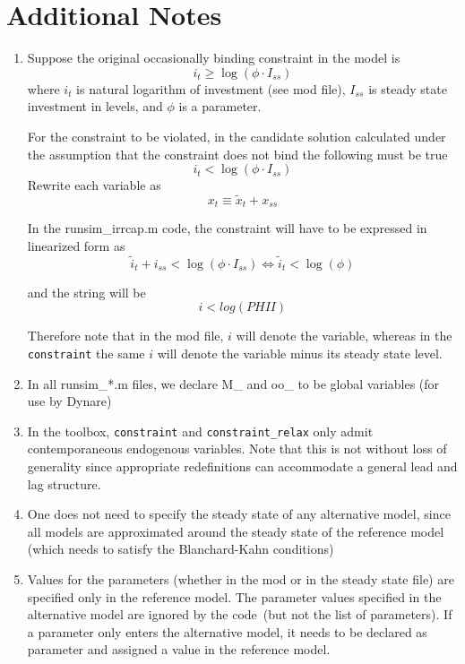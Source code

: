 \documentclass[12pt]{article}
\begin{document}
\section{Additional Notes}

\begin{enumerate}
\item Suppose the original occasionally binding constraint in the model is 
\begin{equation*}
i_{t}\geq \log \left( \phi \cdot I_{ss}\right)
\end{equation*}%
where $i_{t}$ is natural logarithm of investment (see mod file), $I_{ss}$ is
steady state investment in levels, and $\phi $ is a parameter.

For the constraint to be violated, in the candidate solution calculated
under the assumption that the constraint does not bind the following must be
true%
\begin{equation*}
i_{t}<\log \left( \phi \cdot I_{ss}\right)
\end{equation*}%
Rewrite each variable as%
\begin{equation*}
x_{t}\equiv \widetilde{x}_{t}+x_{ss}
\end{equation*}

In the runsim\_irrcap.m code, the constraint will have to be expressed in
linearized form as%
\begin{equation*}
\widetilde{i}_{t}+i_{ss}<\log \left( \phi \cdot I_{ss}\right)
\Longleftrightarrow \widetilde{i}_{t}<\log \left( \phi \right)
\end{equation*}

and the string will be 
\begin{equation*}
i<log(PHII)
\end{equation*}

Therefore note that in the mod file, $i$ will denote the variable, whereas
in the \texttt{constraint} the same $i$ will denote the variable minus its
steady state level.

\item In all runsim\_*.m files, we declare M\_ and oo\_ to be global
variables (for use by Dynare)

\item In the toolbox, \texttt{constraint} and \texttt{constraint\_relax}
only admit contemporaneous endogenous variables. Note that this is not
without loss of generality since appropriate redefinitions can accommodate a
general lead and lag structure.

\item One does not need to specify the steady state of any alternative
model, since all models are approximated around the steady state of the
reference model (which needs to satisfy the Blanchard-Kahn conditions)

\item Values for the parameters (whether in the mod or in the steady state
file) are specified only in the reference model. The parameter values
specified in the alternative model are ignored by the code\ (but not the
list of parameters). If a parameter only enters the alternative model, it
needs to be declared as parameter and assigned a value in the reference
model.
\end{enumerate}
\end{document}
